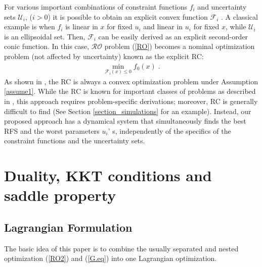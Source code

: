 \documentclass[journal,twoside,web]{ieeecolor}
\newcommand{\rev}[1]{\textcolor{revisionblue}{#1}}
\begin{document}
For various important combinations of constraint functions $f_i$ and uncertainty sets $\mathcal{U}_i$, ($i>0$) it is possible to obtain an explicit convex function $\mathcal{F}_i$ \cite{bental2009}. A classical example is when $f_i$ is linear in $x$ for fixed $u_i$ and linear in $u_i$ for fixed $x$, while $\mathcal{U}_i$ is an ellipsoidal set.
Then, $\mathcal{F}_i$ can be easily derived as an explicit second-order conic function.
In this case, $\mathcal{RO}$ problem (\ref{RO}) becomes a nominal optimization problem (not affected by uncertainty) known as the explicit RC:
\begin{align} \label{rc}
\displaystyle \min_{\mathcal{F}_i(x)\leq 0} f_0(x)\;.
\end{align}
As shown in \cite{bental2009-2}, the RC is always a convex optimization problem under Assumption \ref{assume1}. While the RC is known for important classes of problems as described in \cite{bertsimas2011}, this approach requires problem-specific derivations; moreover, RC is generally difficult to find (See Section \ref{section_simulations} for an example). Instead, our proposed approach has a dynamical system that simultaneously finds the best RFS and the worst parameters $u_i$' s, independently of the specifics of the constraint functions and the uncertainty sets.


\section{Duality, KKT conditions and saddle property} \label{section_saddle}

\subsection*{\rev{Lagrangian Formulation}}
The basic idea of this paper is to combine the usually separated and nested optimization (\ref{RO2}) and (\ref{G.eq}) into one Lagrangian optimization.
\end{document}
